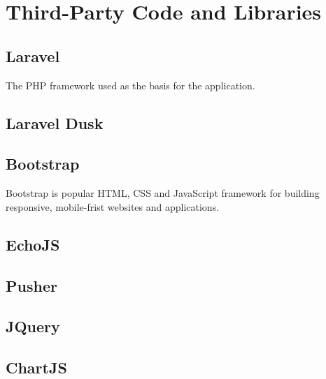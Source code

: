 \chapter{Third-Party Code and Libraries}
\section{Laravel}
The PHP framework used as the basis for the application\cite{laravel}.
\section{Laravel Dusk}
\section{Bootstrap}
Bootstrap is popular HTML, CSS and JavaScript framework for building responsive, mobile-frist websites and applications\cite{bootstrap}.
\section{EchoJS}
\section{Pusher}
\section{JQuery}
\section{ChartJS}